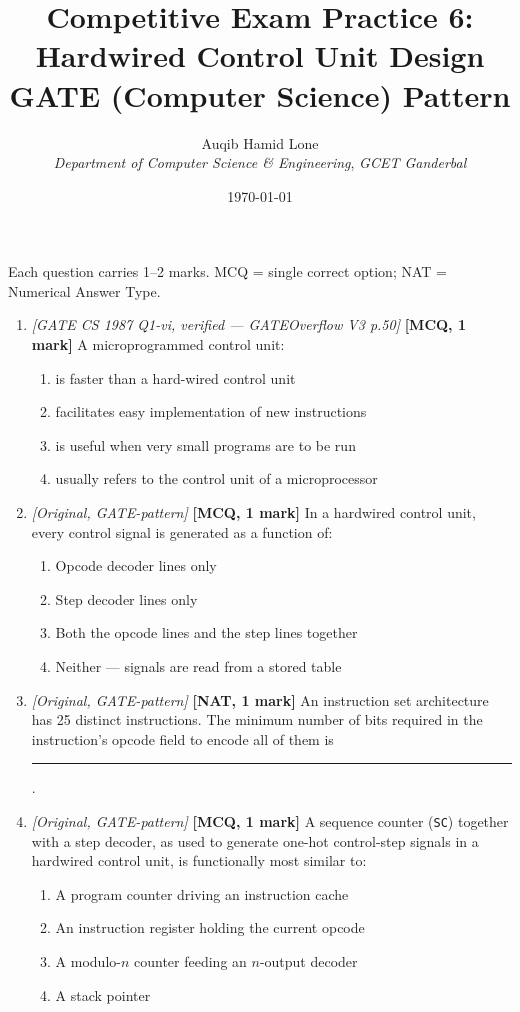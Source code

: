 \documentclass[11pt]{article}
\title{Competitive Exam Practice 6: Hardwired Control Unit Design\\\large GATE (Computer Science) Pattern}
\author{Auqib Hamid Lone\\[0.3em]
  \emph{Department of Computer Science \& Engineering}, \emph{GCET Ganderbal}}
\date{\today}
\begin{document}
\maketitle

\noindent Each question carries 1--2 marks. MCQ = single correct option; NAT = Numerical Answer Type.

\begin{enumerate}
\item[\textbf{Q1}] \textit{[GATE CS 1987 Q1-vi, verified --- GATEOverflow V3 p.50]} \textbf{[MCQ, 1 mark]} A microprogrammed control unit:
\begin{enumerate}
  \item[(A)] is faster than a hard-wired control unit
  \item[(B)] facilitates easy implementation of new instructions
  \item[(C)] is useful when very small programs are to be run
  \item[(D)] usually refers to the control unit of a microprocessor
\end{enumerate}

\item[\textbf{Q2}] \textit{[Original, GATE-pattern]} \textbf{[MCQ, 1 mark]} In a hardwired control unit, every control signal is generated as a function of:
\begin{enumerate}
  \item[(A)] Opcode decoder lines only
  \item[(B)] Step decoder lines only
  \item[(C)] Both the opcode lines and the step lines together
  \item[(D)] Neither --- signals are read from a stored table
\end{enumerate}

\item[\textbf{Q3}] \textit{[Original, GATE-pattern]} \textbf{[NAT, 1 mark]} An instruction set architecture has 25 distinct instructions. The minimum number of bits required in the instruction's opcode field to encode all of them is \rule{1.5cm}{0.4pt}.

\item[\textbf{Q4}] \textit{[Original, GATE-pattern]} \textbf{[MCQ, 1 mark]} A sequence counter (\texttt{SC}) together with a step decoder, as used to generate one-hot control-step signals in a hardwired control unit, is functionally most similar to:
\begin{enumerate}
  \item[(A)] A program counter driving an instruction cache
  \item[(B)] An instruction register holding the current opcode
  \item[(C)] A modulo-$n$ counter feeding an $n$-output decoder
  \item[(D)] A stack pointer
\end{enumerate}


\end{enumerate}
\end{document}
